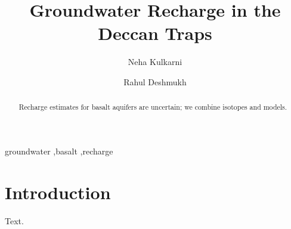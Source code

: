 \documentclass[preprint,12pt]{elsarticle}
\begin{document}
\begin{frontmatter}
\title{Groundwater Recharge in the Deccan Traps}
\author[1]{Neha Kulkarni}
\author[1,2]{Rahul Deshmukh}
\begin{abstract}
Recharge estimates for basalt aquifers are uncertain; we combine isotopes and models.
\end{abstract}
\begin{keyword}
groundwater \sep basalt \sep recharge
\end{keyword}
\end{frontmatter}
\section{Introduction}
Text.
\end{document}
